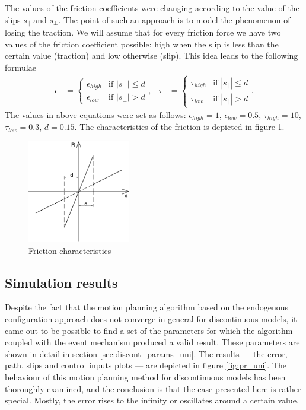 The values of the friction coefficients were changing according to the value of the slips $s_\parallel$
and $s_\perp$. 
The point of such an approach is to model the phenomenon
of losing the traction. We will assume that for every friction force we have two
values of the friction coefficient possible: high when the slip is less than the certain
value (traction) and low otherwise (slip). This idea leads to the following formulae
\begin{equation*}
\begin{aligned}
\epsilon&=\begin{cases}
\epsilon_{high} &\mbox{if } |s_\perp| \leq d \\
\epsilon_{low} &\mbox{if } |s_\perp| > d
\end{cases}, &
\tau&=\begin{cases}
\tau_{high} &\mbox{if } |s_\parallel| \leq d \\
\tau_{low} &\mbox{if } |s_\parallel| > d
\end{cases}.
\end{aligned}
\end{equation*}
The values in above equations were set as follows: $\epsilon_{high}=1$, $\epsilon_{low}=0.5$,
$\tau_{high}=10$, $\tau_{low}=0.3$, $d=0.15$. The characteristics of the friction is depicted
in figure \ref{fig:fric}.
\begin{figure}[htb]
\centering
\includegraphics[width=0.4\textwidth]{img/discont.eps}
\caption{Friction characteristics}
\label{fig:fric}
\end{figure}

\subsection{Simulation results}
Despite the fact that the motion planning algorithm based on the endogenous 
configuration approach does not converge in general for discontinuous models,
it came out to be possible to find a set of the parameters for which the algorithm
coupled with the event mechanism produced
a valid result. These parameters are shown in detail in section \ref{sec:discont_params_uni}.
The results --- the error, path, slips and control inputs plots --- are depicted
in figure \ref{fig:pr_uni}.
The behaviour of this motion planning method for discontinuous models has been thoroughly examined,
and the conclusion is that the case presented here is rather special. Mostly, the error rises to the infinity
or oscillates around a certain value.

